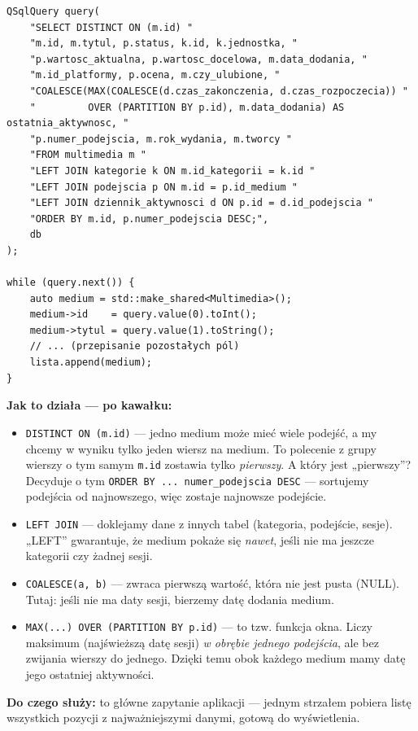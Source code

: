 \documentclass[11pt,a4paper]{article}
\begin{document}
\begin{lstlisting}[caption={Sprytne zapytanie z funkcją okna i DISTINCT ON}]
QSqlQuery query(
    "SELECT DISTINCT ON (m.id) "
    "m.id, m.tytul, p.status, k.id, k.jednostka, "
    "p.wartosc_aktualna, p.wartosc_docelowa, m.data_dodania, "
    "m.id_platformy, p.ocena, m.czy_ulubione, "
    "COALESCE(MAX(COALESCE(d.czas_zakonczenia, d.czas_rozpoczecia)) "
    "         OVER (PARTITION BY p.id), m.data_dodania) AS ostatnia_aktywnosc, "
    "p.numer_podejscia, m.rok_wydania, m.tworcy "
    "FROM multimedia m "
    "LEFT JOIN kategorie k ON m.id_kategorii = k.id "
    "LEFT JOIN podejscia p ON m.id = p.id_medium "
    "LEFT JOIN dziennik_aktywnosci d ON p.id = d.id_podejscia "
    "ORDER BY m.id, p.numer_podejscia DESC;",
    db
);

while (query.next()) {
    auto medium = std::make_shared<Multimedia>();
    medium->id    = query.value(0).toInt();
    medium->tytul = query.value(1).toString();
    // ... (przepisanie pozostałych pól)
    lista.append(medium);
}
\end{lstlisting}

\textbf{Jak to działa --- po kawałku:}
\begin{itemize}
    \item \texttt{DISTINCT ON (m.id)} --- jedno medium może mieć wiele podejść,
    a my chcemy w wyniku tylko jeden wiersz na medium. To polecenie z grupy
    wierszy o tym samym \texttt{m.id} zostawia tylko \emph{pierwszy}. A który jest
    „pierwszy”? Decyduje o tym \texttt{ORDER BY ... numer\_podejscia DESC} ---
    sortujemy podejścia od najnowszego, więc zostaje najnowsze podejście.
    \item \texttt{LEFT JOIN} --- doklejamy dane z innych tabel (kategoria,
    podejście, sesje). „LEFT” gwarantuje, że medium pokaże się \emph{nawet}, jeśli
    nie ma jeszcze kategorii czy żadnej sesji.
    \item \texttt{COALESCE(a, b)} --- zwraca pierwszą wartość, która nie jest pusta
    (NULL). Tutaj: jeśli nie ma daty sesji, bierzemy datę dodania medium.
    \item \texttt{MAX(...) OVER (PARTITION BY p.id)} --- to tzw. funkcja okna.
    Liczy maksimum (najświeższą datę sesji) \emph{w obrębie jednego podejścia},
    ale bez zwijania wierszy do jednego. Dzięki temu obok każdego medium mamy datę
    jego ostatniej aktywności.
\end{itemize}

\textbf{Do czego służy:} to główne zapytanie aplikacji --- jednym strzałem
pobiera listę wszystkich pozycji z najważniejszymi danymi, gotową do wyświetlenia.
\end{document}
